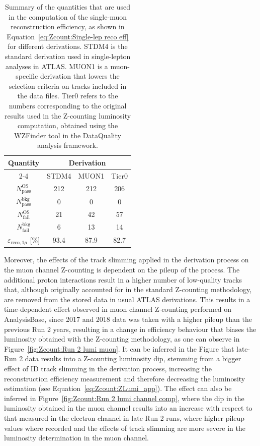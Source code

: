 \begin{table}[!htb]
	\centering
	\begin{tabular}{@{}cccc@{}}
		\toprule
		\multirow{2}{*}{Quantity} & \multicolumn{3}{c}{Derivation} \\ \cmidrule(l){2-4} 
		& STDM4    & MUON1    & Tier0    \\ \midrule
		$N^\text{OS}_\text{pass}$                   & 212      & 212      & 206      \\
		$N^\text{bkg}_\text{pass}$                  & 0        & 0        & 0        \\
		$N^\text{OS}_\text{fail}$                   & 21       & 42       & 57       \\
		$N^\text{bkg}_\text{fail}$                  & 6        & 13       & 14       \\ \midrule
		$\varepsilon_{\text{reco},1\mu}$ [\%]              & 93.4     & 87.9     & 82.7     \\ \bottomrule
	\end{tabular}
	\caption{Summary of the quantities that are used in the computation of the single-muon reconstruction efficiency, as shown in Equation~\ref{eq:Zcount:Single-lep reco eff} for different derivations. STDM4 is the standard derivation used in single-lepton analyses in ATLAS. MUON1 is a muon-specific derivation that lowers the selection criteria on tracks included in the data files. Tier0 refers to the numbers corresponding to the original results used in the Z-counting luminosity computation, obtained using the WZFinder tool in the DataQuality analysis framework.}
	\label{tab:Zcount:muon reco eff}
\end{table}

Moreover, the effects of the track slimming applied in the derivation process on the muon channel Z-counting is dependent on the pileup of the process. The additional proton interactions result in a higher number of low-quality tracks that, although originally accounted for in the standard Z-counting methodology, are removed from the stored data in usual ATLAS derivations. This results in a time-dependent effect observed in muon channel Z-counting performed on AnalysisBase, since 2017 and 2018 data was taken with a higher pileup than the previous Run 2 years, resulting in a change in efficiency behaviour that biases the luminosity obtained with the Z-counting methodology, as one can observe in Figure~\ref{fig:Zcount:Run 2 lumi muon}. It can be inferred in the Figure that late-Run 2 data results into a Z-counting luminosity dip, stemming from a bigger effect of ID track slimming in the derivation process, increasing the reconstruction efficiency measurement and therefore decreasing the luminosity estimation (see Equation~\ref{eq:Zcount:ZLumi_app}). The effect can also be inferred in Figure~\ref{fig:Zcount:Run 2 lumi channel comp}, where the dip in the luminosity obtained in the muon channel results into an increase with respect to that measured in the electron channel in late Run 2 runs, where higher pileup values where recorded and the effects of track slimming are more severe in the luminosity determination in the muon channel.\\

